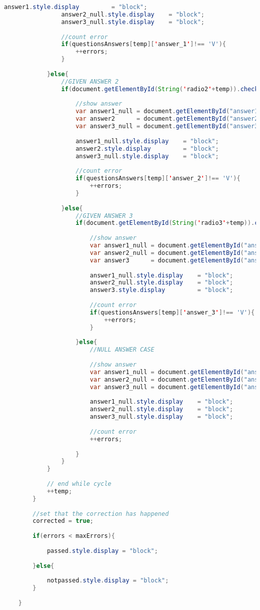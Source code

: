 \begin{lstlisting}[language=java]
				answer1.style.display         = "block";
				answer2_null.style.display    = "block";
				answer3_null.style.display    = "block";
				
				//count error
				if(questionsAnswers[temp]['answer_1']!== 'V'){
					++errors;
				}
				
			}else{
				//GIVEN ANSWER 2
				if(document.getElementById(String('radio2'+temp)).checked){
					
					//show answer
					var answer1_null = document.getElementById("answer1_null"+temp);
					var answer2      = document.getElementById("answer2"+temp);
					var answer3_null = document.getElementById("answer3_null"+temp);
					
					answer1_null.style.display    = "block";
					answer2.style.display         = "block";
					answer3_null.style.display    = "block";
					
					//count error
					if(questionsAnswers[temp]['answer_2']!== 'V'){
						++errors;
					}
					
				}else{
					//GIVEN ANSWER 3
					if(document.getElementById(String('radio3'+temp)).checked){
						
						//show answer
						var answer1_null = document.getElementById("answer1_null"+temp);
						var answer2_null = document.getElementById("answer2_null"+temp);
						var answer3      = document.getElementById("answer3"+temp);
						
						answer1_null.style.display    = "block";
						answer2_null.style.display    = "block";
						answer3.style.display         = "block";
						
						//count error
						if(questionsAnswers[temp]['answer_3']!== 'V'){
							++errors;
						}
						
					}else{
						//NULL ANSWER CASE
						
						//show answer
						var answer1_null = document.getElementById("answer1_null"+temp);
						var answer2_null = document.getElementById("answer2_null"+temp);
						var answer3_null = document.getElementById("answer3_null"+temp);
						
						answer1_null.style.display    = "block";
						answer2_null.style.display    = "block";
						answer3_null.style.display    = "block";
						
						//count error
						++errors;
						
					}
				}
			}
			
			// end while cycle
			++temp;
		}
		
		//set that the correction has happened
		corrected = true;
		
		if(errors < maxErrors){
			
			passed.style.display = "block";
			
		}else{
			
			notpassed.style.display = "block";
		}
		
	}
\end{lstlisting}\leavevmode\\
